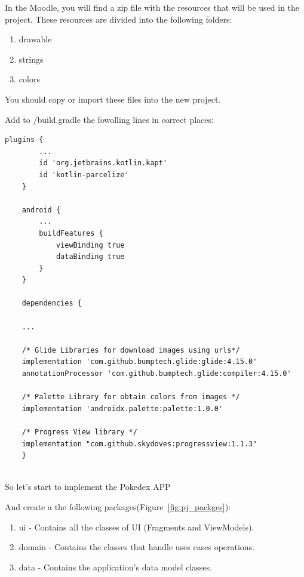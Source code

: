 \documentclass[a4paper, 12pt]{article}
\begin{document}
In the Moodle, you will find a zip file with the resources that will be used in the project.
These resources are divided into the following folders:

\begin{enumerate}
    \item drawable
    \item strings
    \item colors
\end{enumerate}
You should copy or import these files into the new project.

Add to /build.gradle the fowolling lines in correct places:

\begin{lstlisting}[caption={/build.gradle.}, label={code:gradle}, language=XML]
    plugins {
        ...
        id 'org.jetbrains.kotlin.kapt'
        id 'kotlin-parcelize'
    }

    android { 
        ...
        buildFeatures {
            viewBinding true
            dataBinding true
        }
    }

    dependencies {

    ...

    /* Glide Libraries for download images using urls*/
    implementation 'com.github.bumptech.glide:glide:4.15.0'
    annotationProcessor 'com.github.bumptech.glide:compiler:4.15.0'

    /* Palette Library for obtain colors from images */
    implementation 'androidx.palette:palette:1.0.0'

    /* Progress View library */
    implementation "com.github.skydoves:progressview:1.1.3"
    }
    
\end{lstlisting}


So let's start to implement the Pokedex APP 

And create a the following packages(Figure~\ref{fig:pj_packges}):

\begin{enumerate}
	\item ui - Contains all the classes of UI (Fragments and ViewModels).
	\item domain - Contains the classes that handle uses cases operations.
	\item data - Contains the application's data model classes.
\end{enumerate}
\end{document}
